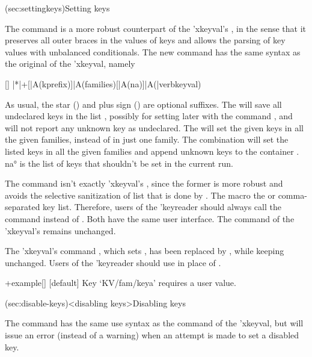 \documentclass[
  use-a4-paper,
  use-10pt-font,
  final-version,
  use-UK-English,
  fancy-section-headings,
  frame-section-numbers,
  para-abstract-style,
  inputfile,
  input-config-file,
  no-hyperref-messages,
  wrapquote
]{amltxdoc}
\begin{document}
\docsection(sec:settingkeys){Setting keys}

The command \fx{\krdsetkeys} is a more robust counterpart of the \pkg'{xkeyval}'s \fx{\setkeys}, in the sense that it preserves all outer braces in the values of keys and allows the parsing of key values with unbalanced conditionals. The new command \fx{\krdsetkeys} has the same syntax as the original \fx{\setkeys} of the \pkg'{xkeyval}, namely

[\krdsetkeys]
\krdsetkeys|*|+[|A(kprefix)]{|A(families)}[|A(na)]{|A(|verbkeyval)}
\fxim*{\krdsetkeys,\setkeys}

As usual, the star (\redstar) and plus sign (\redplus) are optional suffixes. The \stform will save all undeclared keys in the list \fx{\XKV@rm}, possibly for setting later with the command \fx{\setrmkeys}, and will not report any unknown key as undeclared. The \plform will set the given keys in all the given families, instead of in just one family. The combination \redstar\redplus* will set the listed keys in all the given families and append unknown keys to the container \fx{\XKV@rm}. \ang{na} is the list of keys that shouldn't be set in the current run.

The command \fx{\krdsetkeys} isn't exactly \pkg'{xkeyval}'s \fx{\setkeys}, since the former is more robust and avoids the selective sanitization of \keyval list that is done by \fx{\setkeys}. The macro \fx{\krdsetkeys}  the \keyval or comma-separated key list. Therefore, users of the \pkg'{keyreader} should always call the command \fx{\krdsetkeys} instead of \fx{\setkeys}. Both have the same user interface. The \fx{\setkeys} command of the \pkg'{xkeyval}'s remains unchanged.

The \pkg'{xkeyval}'s command \fxi{\setrmkeys}, which sets , has been replaced by \fxi{\krdsetrmkeys}, while keeping \fx{\setrmkeys} unchanged. Users of the \pkg'{keyreader} should use \fx{\krdsetrmkeys} in place of \fx{\setrmkeys}.

\start*+{example}[\ifkrdnovalue]
[default]{%
  \ifkrdnovalue
      {Key `KV/fam/keya' requires a user value.}%
  \else
    \edef\userinput{\unexpanded{#1}}%
  \fi
}


\docsection(sec:disable-keys)<disabling keys>{Disabling keys}

The command \fxim{\krddisablekeys} has the same use syntax as the \fxi{\disable@keys} command of the \pkg'{xkeyval}, but will issue an error (instead of a warning) when an attempt is made to set a disabled key.
\end{document}
